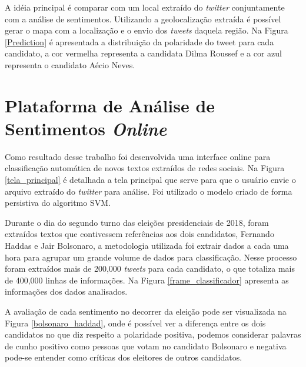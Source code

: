 %


A idéia principal é comparar com um local extraído do \textit{twitter}
conjuntamente com a análise de sentimentos.
Utilizando a geolocalização extraída é possível gerar o mapa
com a localização e o envio dos \textit{tweets} daquela região. Na
Figura \ref{Prediction} é apresentada a distribuição da polaridade do tweet
para cada candidato, a cor vermelha representa a candidata Dilma Roussef 
e a cor azul representa o candidato Aécio Neves.


%



\section{Plataforma de Análise de Sentimentos \textit{Online}}

Como resultado desse trabalho foi desenvolvida uma interface online para classificação automática de novos textos
extraídos de redes sociais. Na Figura \ref{tela_principal} é detalhada a tela principal que serve para que o usuário
envie o arquivo extraído do \textit{twitter} para análise. Foi utilizado o modelo criado de forma persistiva do algoritmo 
\acrshort{SVM}.


%


Durante o dia do segundo turno das eleições presidenciais de 2018, foram extraídos textos que contivessem referências aos dois candidatos, Fernando Haddas
e Jair Bolsonaro, a metodologia utilizada foi extrair dados a cada uma hora para agrupar um grande volume de dados para classificação. Nesse processo
foram extraídos mais de 200,000 \textit{tweets} para cada candidato, o que totaliza mais de 400,000 linhas de informações. Na Figura \ref{frame_classificador} 
apresenta as informações dos dados analisados.

%

A avaliação de cada sentimento no decorrer da eleição pode ser visualizada na Figura \ref{bolsonaro_haddad}, onde é possível ver a diferença 
entre os dois candidatos no que diz respeito a polaridade positiva, podemos considerar palavras de cunho positivo como pessoas que votam 
no candidato Bolsonaro e negativa pode-se entender como críticas dos eleitores de outros candidatos.


